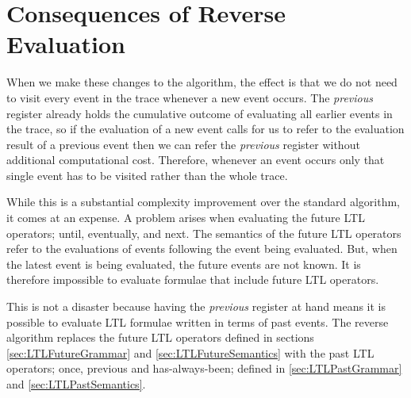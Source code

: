 \section{Consequences of Reverse Evaluation}

When we make these changes to the algorithm, the effect is that we do not need to visit every event in the trace whenever a new event occurs.  The \textit{previous} register already holds the cumulative outcome of evaluating all earlier events in the trace, so if the evaluation of a new event calls for us to refer to the evaluation result of a previous event then we can refer the \textit{previous} register without additional computational cost.  Therefore, whenever an event occurs only that single event has to be visited rather than the whole trace.

While this is a substantial complexity improvement over the standard algorithm, it comes at an expense.  A problem arises when evaluating the future LTL operators; until, eventually, and next.  The semantics of the future LTL operators refer to the evaluations of events following the event being evaluated.  But, when the latest event is being evaluated, the future events are not known.  It is therefore impossible to evaluate formulae that include future LTL operators.

This is not a disaster because having the \textit{previous} register at hand means it is possible to evaluate LTL formulae written in terms of past events.  The reverse algorithm replaces the future LTL operators defined in sections \ref{sec:LTLFutureGrammar} and \ref{sec:LTLFutureSemantics} with the past LTL operators; once, previous and has-always-been; defined in \ref{sec:LTLPastGrammar} and \ref{sec:LTLPastSemantics}.

